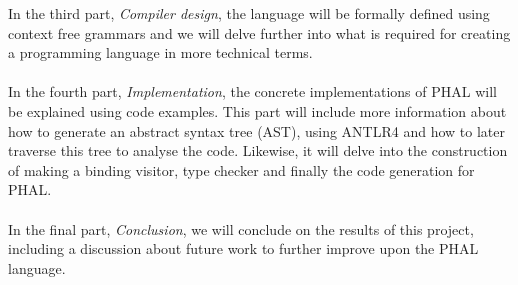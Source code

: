 In the third part, \textit{Compiler design}, the language will be formally defined using context free grammars and we will delve further into what is required for creating a programming language in more technical terms.
\\\\
In the fourth part, \textit{Implementation}, the concrete implementations of PHAL will be explained using code examples. 
This part will include more information about how to generate an abstract syntax tree (AST), using ANTLR4 and how to later traverse this tree to analyse the code.
Likewise, it will delve into the construction of making a binding visitor, type checker and finally the code generation for PHAL.
\\\\
In the final part, \textit{Conclusion}, we will conclude on the results of this project, including a discussion about future work to further improve upon the PHAL language. 